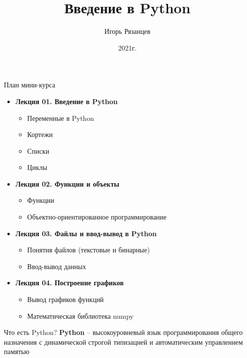 \documentclass[12pt]{beamer}
\author{Игорь Рязанцев}
\title{Введение в Python}
\institute{Лекция 01}
\date{2021г.}
\begin{document}
\begin{frame}
\titlepage
\end{frame}

\begin{frame}{План мини-курса}
\begin{itemize}
\item \textbf{Лекция 01. Введение в Python}
	\begin{itemize}
	\item Переменные в Python
	\item Кортежи
	\item Списки	
	\item Циклы	
	\end{itemize}
\item \textbf{Лекция 02. Функции и объекты} \href{python_mini-course_02.pdf}{}
	\begin{itemize}
	\item Функции
	\item Объектно-ориентированное программирование	
	\end{itemize}
\item \textbf{Лекция 03. Файлы и ввод-вывод в Python} \href{python_mini-course_03.pdf}{}
	\begin{itemize}
	\item Понятия файлов (текстовые и бинарные)
	\item Ввод-вывод данных
	\end{itemize}
\item \textbf{Лекция 04. Построение графиков} \href{python_mini-course_04.pdf}{}
	\begin{itemize}
	\item Вывод графиков функций 
	\item Математическая библиотека numpy
	\end{itemize}
\end{itemize}
\end{frame}


\begin{frame}{Что есть Python?}
\textbf{Python} -- высокоуровневый язык программирования общего назначения с динамической строгой типизацией и автоматическим управлением памятью 
\end{frame}
\end{document}

